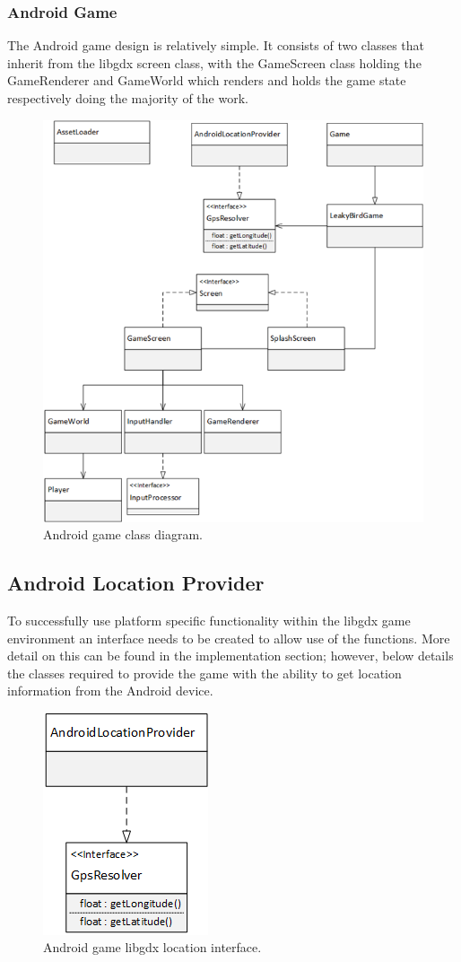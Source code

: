 \subsubsection{Android Game}
The Android game design is relatively simple. It consists of two classes that inherit from the libgdx screen class, with the GameScreen class holding the GameRenderer and GameWorld which renders and holds the game state respectively doing the majority of the work.
\clearpage
\begin{figure}[h!]
\centering\includegraphics{design/figures/ag-cd.png}
\caption{Android game class diagram.}
\end{figure}

\subsection{Android Location Provider}
To successfully use platform specific functionality within the libgdx game environment an interface needs to be created to allow use of the functions. More detail on this can be found in the implementation section; however, below details the classes required to provide the game with the ability to get location information from the Android device.

\begin{figure}[h!]
\centering\includegraphics{design/figures/ag-lp-cd.png}
\caption{Android game libgdx location interface.}
\end{figure}

\clearpage